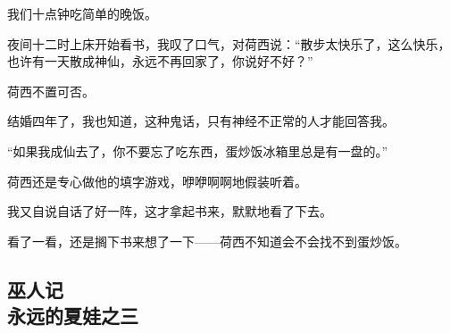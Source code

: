 \par 我们十点钟吃简单的晚饭。
\par 夜间十二时上床开始看书，我叹了口气，对荷西说：“散步太快乐了，这么快乐，也许有一天散成神仙，永远不再回家了，你说好不好？”
\par 荷西不置可否。
\par 结婚四年了，我也知道，这种鬼话，只有神经不正常的人才能回答我。
\par “如果我成仙去了，你不要忘了吃东西，蛋炒饭冰箱里总是有一盘的。”
\par 荷西还是专心做他的填字游戏，咿咿啊啊地假装听着。
\par 我又自说自话了好一阵，这才拿起书来，默默地看了下去。
\par 看了一看，还是搁下书来想了一下——荷西不知道会不会找不到蛋炒饭。



\subsection{巫人记\\\small{永远的夏娃之三}}

